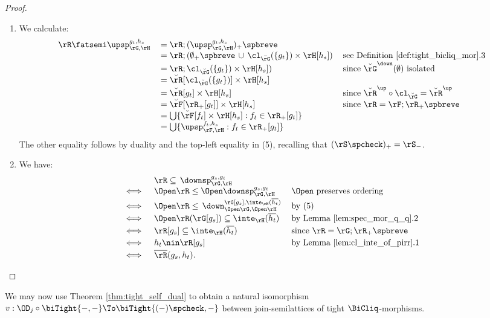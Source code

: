 \documentclass{article}
\begin{document}
\begin{proof}
\begin{enumerate}
\item
We calculate:
\[
\begin{tabular}{lll}
$\rR \fatsemi \upsp_{\rG,\rH}^{g_t,h_s}$
&
$= \rR ; (\upsp_{\rG,\rH}^{g_t,h_s})_+\spbreve$
\\&
$= \rR ; (\emptyset_+\spbreve \,\cup\, \cl_{\breve{\rG}}(\{g_t\}) \times \rH[h_s])$
& see Definition \ref{def:tight_bicliq_mor}.3
\\&
$= \rR ; \cl_{\breve{\rG}}(\{g_t\}) \times \rH[h_s])$
& since $\breve{\rG}^\down(\emptyset)$ isolated
\\&
$= \breve{\rR}[\cl_{\breve{\rG}}(\{g_t\})] \times \rH[h_s]$
\\&
$= \breve{\rR}[g_t] \times \rH[h_s]$
& since $\breve{\rR}^\up \circ \cl_{\breve{\rG}} = \breve{\rR}^\up$
\\&
$= \breve{\rF}[\rR_+[g_t]] \times \rH[h_s]$
& since $\rR = \rF ; \rR_+\spbreve$
\\&
$= \bigcup \{ \breve{\rF}[f_t] \times \rH[h_s] : f_t \in \rR_+[g_t] \}$
\\&
$= \bigcup \{  \upsp_{\rF,\rH}^{f_t,h_s} : f_t \in \rR_+[g_t] \}$
\end{tabular}
\]
The other equality follows by duality and the top-left equality in (5), recalling that $(\rS\spcheck)_+ = \rS_-$.

\item
We have:
\[
\begin{tabular}{lll}
& $\rR \subseteq \, \downsp_{\rG,\rH}^{g_s,g_t}$
\\ $\iff$ &
$\Open\rR \leq \Open \downsp_{\rG,\rH}^{g_s,g_t}$
& $\Open$ preserves ordering
\\[0.5ex] $\iff$ &
$\Open\rR \leq \,\down_{\Open\rG,\Open\rH}^{\rG[g_s],\inte_\rH(\overline{h_t})}$
& by (5)
\\[0.5ex] $\iff$ &
$\Open\rR(\rG[g_s]) \subseteq \inte_\rH(\overline{h_t})$
& by Lemma \ref{lem:spec_mor_q_q}.2
\\[0.5ex] $\iff$ &
$\rR[g_s] \subseteq \inte_\rH(\overline{h_t})$
& since $\rR = \rG ; \rR_+\spbreve$
\\[0.5ex] $\iff$ &
$h_t \nin \rR[g_s]$
& by Lemma \ref{lem:cl_inte_of_pirr}.1
\\[0.5ex] $\iff$ &
$\overline{\rR}(g_s,h_t)$.
\end{tabular}
\]


\end{enumerate}
\end{proof}



We may now use Theorem \ref{thm:tight_self_dual} to obtain a natural isomorphism $v : \OD_j \circ \biTight{-,-} \To \biTight{(-)\spcheck,-}$ between join-semilattices of tight $\BiCliq$-morphisms.
\end{document}
